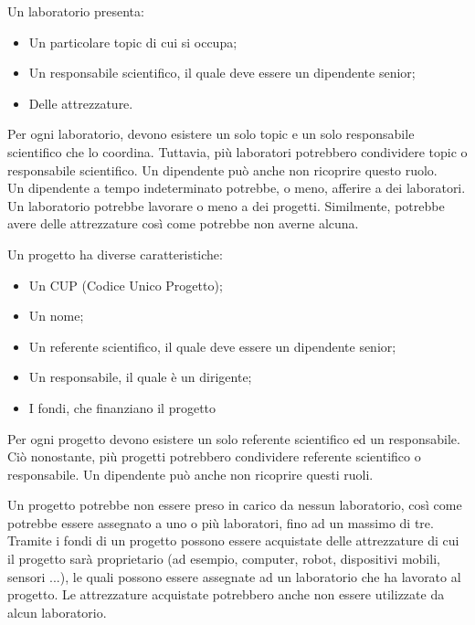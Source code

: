         \noindent Un laboratorio presenta:
        \begin{itemize}
            \item Un particolare topic di cui si occupa;
            \item Un responsabile scientifico, il quale deve essere un dipendente senior;
            \item Delle attrezzature.
        \end{itemize}

        Per ogni laboratorio, devono esistere un solo topic e un solo responsabile scientifico che lo coordina.
        Tuttavia, più laboratori potrebbero condividere topic o responsabile scientifico. Un dipendente può anche non ricoprire questo ruolo.\\
        Un dipendente a tempo indeterminato potrebbe, o meno, afferire a dei laboratori.\\
        Un laboratorio potrebbe lavorare o meno a dei progetti. Similmente, potrebbe avere delle attrezzature così come potrebbe non averne alcuna.
        \vspace{1\baselineskip}

        \noindent Un progetto ha diverse caratteristiche:
        \begin{itemize}
            \item Un CUP (Codice Unico Progetto);
            \item Un nome;
            \item Un referente scientifico, il quale deve essere un dipendente senior;
            \item Un responsabile, il quale è un dirigente;
            \item I fondi, che finanziano il progetto
        \end{itemize}
        
        Per ogni progetto devono esistere un solo referente scientifico ed un responsabile. Ciò nonostante, più progetti potrebbero condividere referente scientifico o responsabile. Un dipendente può anche non ricoprire questi ruoli.
        
        Un progetto potrebbe non essere preso in carico da nessun laboratorio, così come potrebbe essere assegnato a uno o più laboratori, fino ad un massimo di tre.\\
        
        Tramite i fondi di un progetto possono essere acquistate delle attrezzature di cui il progetto sarà proprietario (ad esempio, computer, robot, dispositivi mobili, sensori ...), le quali possono essere assegnate ad un laboratorio che ha lavorato al progetto. Le attrezzature acquistate potrebbero anche non essere utilizzate da alcun laboratorio.
        

